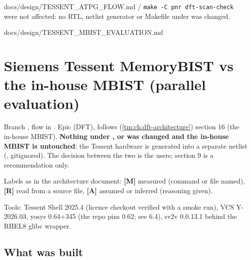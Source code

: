 \begin{relocated}{docs/design/TESSENT_ATPG_FLOW.md}
 /
\texttt{make\ -\allowbreak{}C\ pnr\ dft-\allowbreak{}scan-\allowbreak{}check}
were not affected: no RTL, netlist generator or Makefile under
 was changed.
\end{relocated}

\begin{relocated}{docs/design/TESSENT_MBIST_EVALUATION.md}
\section{Siemens Tessent MemoryBIST vs the in-house MBIST (parallel
evaluation)}\label{tm:dec:tessent-mbist-evaluation}

Branch , flow in . Epic
 (DFT), follows  (\cref{tm:ch:dft-architecture}) section
16 (the in-house MBIST). \textbf{Nothing under ,  or
 was changed and the in-house MBIST is untouched}: the Tessent
hardware is generated into a separate netlist
(, gitignored). The decision between the
two is the user\textquotesingle s; section 9 is a recommendation only.

Labels as in the architecture document: \textbf{{[}M{]}} measured
(command or file named), \textbf{{[}R{]}} read from a source file,
\textbf{{[}A{]}} assumed or inferred (reasoning given).

Tools: Tessent Shell 2025.4 (licence checkout verified with a smoke
run), VCS Y-2026.03, yosys 0.64+345 (the repo pins 0.62; see 6.4), sv2v
0.0.13.1 behind the RHEL8 glibc wrapper.

\subsection{What was built}\label{tm:dec:tessent-mbist-evaluation:1-what-was-built}

{\footnotesize\setlength{\tabcolsep}{3pt}

}
\end{relocated}

